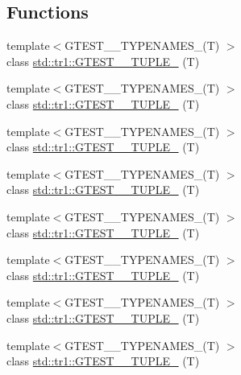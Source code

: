 \subsection*{Functions}
\begin{DoxyCompactItemize}
\item 
{\footnotesize template$<$G\+T\+E\+S\+T\+\_\+\_\+\+T\+Y\+P\+E\+N\+A\+M\+E\+S\+\_\+(\+T) $>$ }\\class \hyperlink{namespacestd_1_1tr1_a9971f52f994f142fe36c786b991cfd3e}{std\+::tr1\+::\+G\+T\+E\+S\+T\+\_\+\_\+\+T\+U\+P\+L\+E\+\_\+} (T)
\item 
{\footnotesize template$<$G\+T\+E\+S\+T\+\_\+\_\+\+T\+Y\+P\+E\+N\+A\+M\+E\+S\+\_\+(\+T) $>$ }\\class \hyperlink{namespacestd_1_1tr1_a05651180c3a4c06fe0f3b09144b82b93}{std\+::tr1\+::\+G\+T\+E\+S\+T\+\_\+\_\+\+T\+U\+P\+L\+E\+\_\+} (T)
\item 
{\footnotesize template$<$G\+T\+E\+S\+T\+\_\+\_\+\+T\+Y\+P\+E\+N\+A\+M\+E\+S\+\_\+(\+T) $>$ }\\class \hyperlink{namespacestd_1_1tr1_a368170c49cc7d7f130c0564bbad01205}{std\+::tr1\+::\+G\+T\+E\+S\+T\+\_\+\_\+\+T\+U\+P\+L\+E\+\_\+} (T)
\item 
{\footnotesize template$<$G\+T\+E\+S\+T\+\_\+\_\+\+T\+Y\+P\+E\+N\+A\+M\+E\+S\+\_\+(\+T) $>$ }\\class \hyperlink{namespacestd_1_1tr1_a661b17d2b7137863f06a016762f5c888}{std\+::tr1\+::\+G\+T\+E\+S\+T\+\_\+\_\+\+T\+U\+P\+L\+E\+\_\+} (T)
\item 
{\footnotesize template$<$G\+T\+E\+S\+T\+\_\+\_\+\+T\+Y\+P\+E\+N\+A\+M\+E\+S\+\_\+(\+T) $>$ }\\class \hyperlink{namespacestd_1_1tr1_a51b070e2eb5e6bb83a290f35c19667dd}{std\+::tr1\+::\+G\+T\+E\+S\+T\+\_\+\_\+\+T\+U\+P\+L\+E\+\_\+} (T)
\item 
{\footnotesize template$<$G\+T\+E\+S\+T\+\_\+\_\+\+T\+Y\+P\+E\+N\+A\+M\+E\+S\+\_\+(\+T) $>$ }\\class \hyperlink{namespacestd_1_1tr1_a485b05fdbbcfcf7ad5e4234e17702268}{std\+::tr1\+::\+G\+T\+E\+S\+T\+\_\+\_\+\+T\+U\+P\+L\+E\+\_\+} (T)
\item 
{\footnotesize template$<$G\+T\+E\+S\+T\+\_\+\_\+\+T\+Y\+P\+E\+N\+A\+M\+E\+S\+\_\+(\+T) $>$ }\\class \hyperlink{namespacestd_1_1tr1_ab451b390a95ee0555d7a43b67ea348aa}{std\+::tr1\+::\+G\+T\+E\+S\+T\+\_\+\_\+\+T\+U\+P\+L\+E\+\_\+} (T)
\item 
{\footnotesize template$<$G\+T\+E\+S\+T\+\_\+\_\+\+T\+Y\+P\+E\+N\+A\+M\+E\+S\+\_\+(\+T) $>$ }\\class \hyperlink{namespacestd_1_1tr1_ab2b1c72e9db7436909d9ac011645f29d}{std\+::tr1\+::\+G\+T\+E\+S\+T\+\_\+\_\+\+T\+U\+P\+L\+E\+\_\+} (T)

\end{DoxyCompactItemize}
